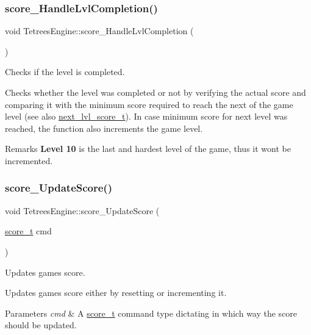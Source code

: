 \subsubsection{\texorpdfstring{score\+\_\+\+Handle\+Lvl\+Completion()}{score\_HandleLvlCompletion()}}
{\footnotesize\ttfamily void Tetrees\+Engine\+::score\+\_\+\+Handle\+Lvl\+Completion (\begin{DoxyParamCaption}{ }\end{DoxyParamCaption})\hspace{0.3cm}{\ttfamily [private]}}



Checks if the level is completed. 

Checks whether the level was completed or not by verifying the actual score and comparing it with the minimum score required to reach the next of the game level (see also \hyperlink{TetreesDefs_8hpp_adb9f7ea75cb8fca17c40bc2afbe399ca}{next\+\_\+lvl\+\_\+score\+\_\+t}). In case minimum score for next level was reached, the function also increments the game level. \begin{DoxyRemark}{Remarks}
{\bfseries Level 10} is the last and hardest level of the game, thus it won\textquotesingle{}t be incremented. 
\end{DoxyRemark}
\mbox{\label{classTetreesEngine_a856a9de6a79138a19b638d9287d7bc72}} 
\subsubsection{\texorpdfstring{score\+\_\+\+Update\+Score()}{score\_UpdateScore()}}
{\footnotesize\ttfamily void Tetrees\+Engine\+::score\+\_\+\+Update\+Score (\begin{DoxyParamCaption}\item[{\hyperlink{TetreesDefs_8hpp_a5a3b4d94c69ae85b911a8dca1afedfe0}{score\+\_\+t}}]{cmd }\end{DoxyParamCaption})\hspace{0.3cm}{\ttfamily [private]}}



Updates game\textquotesingle{}s score. 

Updates game\textquotesingle{}s score either by resetting or incrementing it. 
\begin{DoxyParams}{Parameters}
{\em cmd} & A \hyperlink{TetreesDefs_8hpp_a5a3b4d94c69ae85b911a8dca1afedfe0}{score\+\_\+t} command type dictating in which way the score should be updated. \\
\hline
\end{DoxyParams}
\mbox{\label{classTetreesEngine_a0978ef1f287f00a8ed5a4af2d680b943}} 
